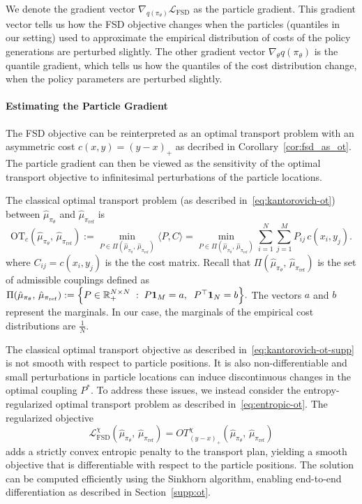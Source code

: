 We denote the gradient vector $\nabla_{q(\pi_{\theta})}\mathcal{L}_{\mathrm{FSD}}$ as the particle gradient. This gradient vector tells us how the FSD objective changes when the particles (quantiles in our setting) used to approximate the empirical distribution of costs of the policy generations are perturbed slightly. The other gradient vector $\nabla_{\theta} q(\pi_{\theta})$ is the quantile gradient, which tells us how the quantiles of the cost distribution change, when the policy parameters are perturbed slightly.

\paragraph{Estimating the Particle Gradient} The FSD objective can be reinterpreted as an optimal transport problem with an asymmetric cost
$c(x,y) = (y - x)_{+}$ as decribed in Corollary~\ref{cor:fsd_as_ot}. The particle gradient can then be viewed as the sensitivity of the optimal transport objective to infinitesimal perturbations of the particle locations.

The classical optimal transport problem (as described in~\eqref{eq:kantorovich-ot}) between $\hat{\mu}_{\pi_\theta}$ and $\hat{\mu}_{\pi_{\mathrm{ref}}}$ is
\begin{equation}
  \mathrm{OT}_c(\hat{\mu}_{\pi_{\theta}},\,\hat{\mu}_{\pi_{\mathrm{ref}}}) := \min_{P \in \Pi(\hat{\mu}_{\pi_{\theta}},\,\hat{\mu}_{\pi_{\mathrm{ref}}})} \langle P, C \rangle
  = \min_{P \in \Pi(\hat{\mu}_{\pi_{\theta}},\,\hat{\mu}_{\pi_{\mathrm{ref}}})} \sum_{i=1}^N \sum_{j=1}^M P_{ij}\, c(x_i, y_j).
  \label{eq:kantorovich-ot-supp}
\end{equation}
where $C_{ij} = c(x_i, y_j)$ is the the cost matrix. Recall that $\Pi(\hat{\mu}_{\pi_{\theta}},\,\hat{\mu}_{\pi_{\mathrm{ref}}}) $ is the set of admissible couplings defined as $\Pi(\hat{\mu}_{\pi_{\theta}},\,\hat{\mu}_{\pi_{\mathrm{ref}}}) := \Bigl\{ P \in \mathbb{R}_+^{N \times N} \;:\; P \mathbf{1}_M = a, \;\; P^\top \mathbf{1}_N = b \Bigr\}.$ The vectors $a$ and $b$ represent the marginals. In our case, the marginals of the empirical cost distributions are $\frac{1}{N}$. 

The classical optimal transport objective as described in~\eqref{eq:kantorovich-ot-supp} is not smooth with respect to particle positions. It is also non-differentiable and small perturbations in particle locations can induce discontinuous changes in the optimal coupling $P^*$. To address these issues, we instead consider the entropy-regularized optimal transport problem as described in~\eqref{eq:entropic-ot}. The regularized objective
\[
  \mathcal{L}_{\mathrm{FSD}}^{\chi}(\hat{\mu}_{\pi_{\theta}},\,\hat{\mu}_{\pi_{\mathrm{ref}}})
  =
  OT^{\chi}_{(y-x)_{+}}\!\left(\hat{\mu}_{\pi_{\theta}},\,\hat{\mu}_{\pi_{\mathrm{ref}}}\right)
\]
adds a strictly convex entropic penalty to the transport plan, yielding a smooth objective that is differentiable with respect to the particle positions. The solution can be computed efficiently using the Sinkhorn algorithm, enabling end-to-end differentiation as described in Section~\ref{supp:ot}.

